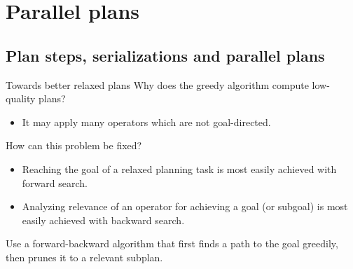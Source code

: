 \documentclass{gkibeamer}
\begin{document}
\subtitle{Planning as search: relaxation heuristics}
\date{November 22nd, 2011}
\maketitles

\section{Parallel plans}
\subsection[Plan steps]{Plan steps, serializations and parallel plans}

\begin{frame}{Towards better relaxed plans}
  Why does the greedy algorithm compute low-quality plans?
  \begin{itemize}
  \item It may apply many operators which are not
    \alert{goal-directed}.
  \end{itemize}

  \bigskip

  How can this problem be fixed?
  \begin{itemize}
  \item \alert{Reaching the goal} of a relaxed planning task is most
    easily achieved with \alert{forward search}.
  \item Analyzing \alert{relevance} of an operator for achieving a
    goal (or subgoal) is most easily achieved with \alert{backward
      search}.
  \end{itemize}
  
  \bigskip
  
   Use a \alert{forward-backward} algorithm that first
  finds a path to the goal greedily, then prunes it to a relevant
  subplan.
\end{frame}
\end{document}
